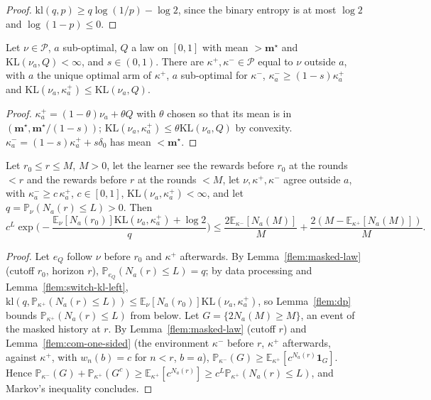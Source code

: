 \documentclass[11pt]{article}
\newcommand{\E}{\mathbb{E}}
\newcommand{\PP}{\mathbb{P}}
\newcommand{\KL}{\mathrm{KL}}
\newcommand{\cP}{\mathcal P}
\begin{document}
\begin{proof}
\uses{}
$\mathrm{kl}(q,p)\ge q\log(1/p)-\log2$, since the binary entropy is at most $\log2$ and
$\log(1-p)\le0$.
\end{proof}

\begin{lemma}\label{flem:alt-laws}
Let $\nu\in\cP$, $a$ sub-optimal, $Q$ a law on $[0,1]$ with mean $>\mathbf m^\star$ and
$\KL(\nu_a,Q)<\infty$, and $s\in(0,1)$. There are $\kappa^+,\kappa^-\in\cP$ equal to $\nu$ outside
$a$, with $a$ the unique optimal arm of $\kappa^+$, $a$ sub-optimal for $\kappa^-$,
$\kappa^-_a\ge(1-s)\kappa^+_a$ and $\KL(\nu_a,\kappa^+_a)\le\KL(\nu_a,Q)$.
\end{lemma}

\begin{proof}
$\kappa^+_a=(1-\theta)\nu_a+\theta Q$ with $\theta$ chosen so that its mean is in
$(\mathbf m^\star,\mathbf m^\star/(1-s))$; $\KL(\nu_a,\kappa^+_a)\le\theta\KL(\nu_a,Q)$ by
convexity. $\kappa^-_a=(1-s)\kappa^+_a+s\delta_0$ has mean $<\mathbf m^\star$.
\end{proof}

\begin{lemma}\label{flem:twobatches-finite}
Let $r_0\le r\le M$, $M>0$, let the learner see the rewards before $r_0$ at the rounds $<r$ and the
rewards before $r$ at the rounds $<M$, let $\nu,\kappa^+,\kappa^-$ agree outside $a$, with
$\kappa^-_a\ge c\,\kappa^+_a$, $c\in[0,1]$, $\KL(\nu_a,\kappa^+_a)<\infty$, and let
$q=\PP_\nu(N_a(r)\le L)>0$. Then
\[
c^L\exp\Big(-\frac{\E_\nu[N_a(r_0)]\KL(\nu_a,\kappa^+_a)+\log2}{q}\Big)\le
\frac{2\E_{\kappa^-}[N_a(M)]}{M}+\frac{2(M-\E_{\kappa^+}[N_a(M)])}{M}.
\]
\end{lemma}

\begin{proof}
Let $e_Q$ follow $\nu$ before $r_0$ and $\kappa^+$ afterwards. By Lemma~\ref{flem:masked-law} (cutoff
$r_0$, horizon $r$), $\PP_{e_Q}(N_a(r)\le L)=q$; by data processing and
Lemma~\ref{flem:switch-kl-left}, $\mathrm{kl}(q,\PP_{\kappa^+}(N_a(r)\le L))\le
\E_\nu[N_a(r_0)]\KL(\nu_a,\kappa^+_a)$, so Lemma~\ref{flem:dp} bounds $\PP_{\kappa^+}(N_a(r)\le L)$
from below. Let $G=\{2N_a(M)\ge M\}$, an event of the masked history at $r$. By
Lemma~\ref{flem:masked-law} (cutoff $r$) and Lemma~\ref{flem:com-one-sided} (the environment
$\kappa^-$ before $r$, $\kappa^+$ afterwards, against $\kappa^+$, with $w_n(b)=c$ for $n<r$,
$b=a$), $\PP_{\kappa^-}(G)\ge\E_{\kappa^+}[c^{N_a(r)}\mathbf 1_G]$. Hence
$\PP_{\kappa^-}(G)+\PP_{\kappa^+}(G^c)\ge\E_{\kappa^+}[c^{N_a(r)}]\ge c^L\PP_{\kappa^+}(N_a(r)\le L)$,
and Markov's inequality concludes.
\end{proof}
\end{document}
